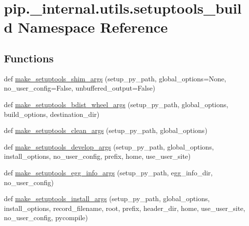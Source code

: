 \hypertarget{namespacepip_1_1__internal_1_1utils_1_1setuptools__build}{}\section{pip.\+\_\+internal.\+utils.\+setuptools\+\_\+build Namespace Reference}
\label{namespacepip_1_1__internal_1_1utils_1_1setuptools__build}
\subsection*{Functions}
\begin{DoxyCompactItemize}
\item 
def \hyperlink{namespacepip_1_1__internal_1_1utils_1_1setuptools__build_ac5357d4c39add9319dafde87c138f590}{make\+\_\+setuptools\+\_\+shim\+\_\+args} (setup\+\_\+py\+\_\+path, global\+\_\+options=None, no\+\_\+user\+\_\+config=False, unbuffered\+\_\+output=False)
\item 
def \hyperlink{namespacepip_1_1__internal_1_1utils_1_1setuptools__build_a86d56d3882515c25a324e49c818149e9}{make\+\_\+setuptools\+\_\+bdist\+\_\+wheel\+\_\+args} (setup\+\_\+py\+\_\+path, global\+\_\+options, build\+\_\+options, destination\+\_\+dir)
\item 
def \hyperlink{namespacepip_1_1__internal_1_1utils_1_1setuptools__build_a08d7c496bdf77b0515cbe416ea3db1a7}{make\+\_\+setuptools\+\_\+clean\+\_\+args} (setup\+\_\+py\+\_\+path, global\+\_\+options)
\item 
def \hyperlink{namespacepip_1_1__internal_1_1utils_1_1setuptools__build_adacdcdb79c541588e3fff6d7f9041847}{make\+\_\+setuptools\+\_\+develop\+\_\+args} (setup\+\_\+py\+\_\+path, global\+\_\+options, install\+\_\+options, no\+\_\+user\+\_\+config, prefix, home, use\+\_\+user\+\_\+site)
\item 
def \hyperlink{namespacepip_1_1__internal_1_1utils_1_1setuptools__build_ad18fe413ed35eb807c949086fa69f598}{make\+\_\+setuptools\+\_\+egg\+\_\+info\+\_\+args} (setup\+\_\+py\+\_\+path, egg\+\_\+info\+\_\+dir, no\+\_\+user\+\_\+config)
\item 
def \hyperlink{namespacepip_1_1__internal_1_1utils_1_1setuptools__build_af0ddc34df16dded589dca98b26f7c3f5}{make\+\_\+setuptools\+\_\+install\+\_\+args} (setup\+\_\+py\+\_\+path, global\+\_\+options, install\+\_\+options, record\+\_\+filename, root, prefix, header\+\_\+dir, home, use\+\_\+user\+\_\+site, no\+\_\+user\+\_\+config, pycompile)
\end{DoxyCompactItemize}


